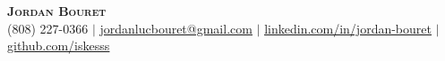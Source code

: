 \begin{center}
    \textbf{\Huge \scshape Jordan Bouret} \\ \vspace{1pt}
	\small (808) 227-0366 $|$ \href{mailto:jordanlucbouret@gmail.com}{\underline{jordanlucbouret@gmail.com}} $|$ 
    \href{https://www.linkedin.com/in/jordan-bouret/}{\underline{linkedin.com/in/jordan-bouret}} $|$
    \href{https://github.com/iskesss}{\underline{github.com/iskesss}}
\end{center}
